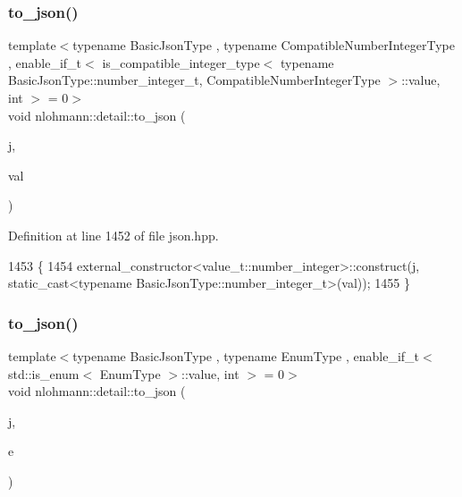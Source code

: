 \subsubsection{\texorpdfstring{to\+\_\+json()}{to\_json()}\hspace{0.1cm}{\footnotesize\ttfamily [6/16]}}
{\footnotesize\ttfamily template$<$typename Basic\+Json\+Type , typename Compatible\+Number\+Integer\+Type , enable\+\_\+if\+\_\+t$<$ is\+\_\+compatible\+\_\+integer\+\_\+type$<$ typename Basic\+Json\+Type\+::number\+\_\+integer\+\_\+t, Compatible\+Number\+Integer\+Type $>$\+::value, int $>$  = 0$>$ \\
void nlohmann\+::detail\+::to\+\_\+json (\begin{DoxyParamCaption}\item[{Basic\+Json\+Type \&}]{j,  }\item[{Compatible\+Number\+Integer\+Type}]{val }\end{DoxyParamCaption})\hspace{0.3cm}{\ttfamily [noexcept]}}



Definition at line 1452 of file json.\+hpp.


\begin{DoxyCode}
1453 \{
1454     external\_constructor<value\_t::number\_integer>::construct(j, static\_cast<typename
       BasicJsonType::number\_integer\_t>(val));
1455 \}
\end{DoxyCode}
\mbox{\label{namespacenlohmann_1_1detail_a0c8b159dba71981d6c555d284cf6e2bf}} 
\subsubsection{\texorpdfstring{to\+\_\+json()}{to\_json()}\hspace{0.1cm}{\footnotesize\ttfamily [7/16]}}
{\footnotesize\ttfamily template$<$typename Basic\+Json\+Type , typename Enum\+Type , enable\+\_\+if\+\_\+t$<$ std\+::is\+\_\+enum$<$ Enum\+Type $>$\+::value, int $>$  = 0$>$ \\
void nlohmann\+::detail\+::to\+\_\+json (\begin{DoxyParamCaption}\item[{Basic\+Json\+Type \&}]{j,  }\item[{Enum\+Type}]{e }\end{DoxyParamCaption})\hspace{0.3cm}{\ttfamily [noexcept]}}




